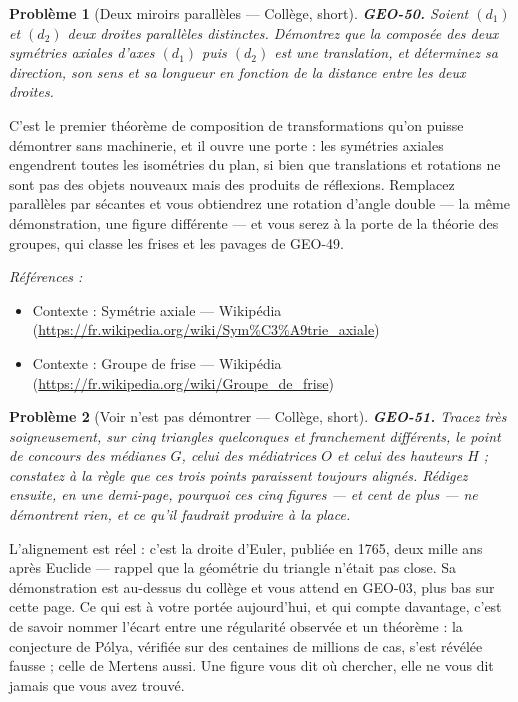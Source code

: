 \documentclass[11pt]{article}
\newtheorem{problem}{Problème}
\newenvironment{refs}{\par\small\noindent\emph{Références :}\begin{itemize}\setlength\itemsep{0pt}}{\end{itemize}\normalsize}
\begin{document}
\bigskip

\begin{problem}[{Deux miroirs parallèles --- Collège, short}]
\textbf{GEO-50.} Soient $ (d_1) $ et $ (d_2) $ deux droites parallèles
distinctes. Démontrez que la composée des deux symétries axiales d'axes $ (d_1) $ puis $ (d_2) $
est une translation, et déterminez sa direction, son sens et sa longueur en fonction de la distance
entre les deux droites.
\end{problem}

\noindent C'est le premier théorème de composition de transformations qu'on puisse démontrer
sans machinerie, et il ouvre une porte : les symétries axiales engendrent toutes les isométries du
plan, si bien que translations et rotations ne sont pas des objets nouveaux mais des produits de
réflexions. Remplacez \og{} parallèles \fg{} par \og{} sécantes \fg{} et vous obtiendrez une rotation d'angle double
--- la même démonstration, une figure différente --- et vous serez à la porte de la théorie des groupes,
qui classe les frises et les pavages de GEO-49.

\begin{refs}
\item Contexte : Symétrie axiale --- Wikipédia (\url{https://fr.wikipedia.org/wiki/Sym%C3%A9trie_axiale})
\item Contexte : Groupe de frise --- Wikipédia (\url{https://fr.wikipedia.org/wiki/Groupe_de_frise})
\end{refs}

\bigskip

\begin{problem}[{Voir n'est pas démontrer --- Collège, short}]
\textbf{GEO-51.} Tracez très soigneusement, sur cinq triangles quelconques et
franchement différents, le point de concours des médianes $ G $, celui des médiatrices $ O $ et
celui des hauteurs $ H $ ; constatez à la règle que ces trois points paraissent toujours alignés.
Rédigez ensuite, en une demi-page, pourquoi ces cinq figures --- et cent de plus --- ne démontrent rien,
et ce qu'il faudrait produire à la place.
\end{problem}

\noindent L'alignement est réel : c'est la droite d'Euler, publiée en 1765, deux mille ans
après Euclide --- rappel que la géométrie du triangle n'était pas close. Sa démonstration est au-dessus
du collège et vous attend en GEO-03, plus bas sur cette page. Ce qui est à votre portée aujourd'hui,
et qui compte davantage, c'est de savoir nommer l'écart entre une régularité observée et un théorème :
la conjecture de Pólya, vérifiée sur des centaines de millions de cas, s'est révélée fausse ; celle de
Mertens aussi. Une figure vous dit où chercher, elle ne vous dit jamais que vous avez trouvé.
\end{document}
